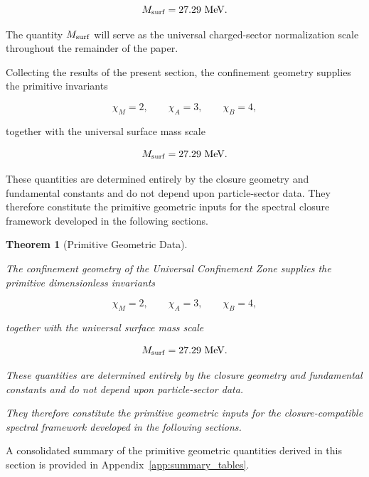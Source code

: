 \documentclass[11pt]{article}
\newtheorem{theorem}{Theorem}[section]
\theoremstyle{definition}
\theoremstyle{remark}
\begin{document}
\begin{equation}
M_{\rm surf}
=
27.29\ {\rm MeV}.
\label{eq:MsurfNumerical}
\end{equation}

The quantity \(M_{\rm surf}\) will serve as the universal
charged-sector normalization scale throughout the remainder of
the paper.

Collecting the results of the present section, the confinement
geometry supplies the primitive invariants

\begin{equation}
\chi_M = 2,
\qquad
\chi_A = 3,
\qquad
\chi_B = 4,
\end{equation}

together with the universal surface mass scale

\begin{equation}
M_{\rm surf}
=
27.29\ {\rm MeV}.
\end{equation}

These quantities are determined entirely by the closure geometry
and fundamental constants and do not depend upon particle-sector
data. They therefore constitute the primitive geometric inputs
for the spectral closure framework developed in the following
sections.

\begin{theorem}[Primitive Geometric Data]
\label{thm:primitive_geometric_data}

The confinement geometry of the Universal Confinement Zone
supplies the primitive dimensionless invariants

\begin{equation}
\chi_M = 2, \qquad \chi_A = 3,
\qquad \chi_B = 4,
\end{equation}

together with the universal surface mass scale

\begin{equation}
M_{\rm surf} = 27.29~{\rm MeV}.
\end{equation}

These quantities are determined entirely by the closure
geometry and fundamental constants and do not depend upon
particle-sector data.

They therefore constitute the primitive geometric inputs for
the closure-compatible spectral framework developed in the
following sections.

\end{theorem}

A consolidated summary of the primitive geometric quantities
derived in this section is provided in
Appendix~\ref{app:summary_tables}.
\end{document}
